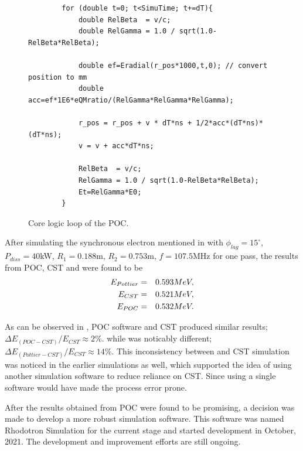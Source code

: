 \documentclass[a4paper,oneside,12pt]{report}
\numberwithin{equation}{chapter}
\begin{document}
\begin{figure}[H]
    \begin{verbatim}
        for (double t=0; t<SimuTime; t+=dT){
            double RelBeta  = v/c;
            double RelGamma = 1.0 / sqrt(1.0-RelBeta*RelBeta);
        
            double ef=Eradial(r_pos*1000,t,0); // convert position to mm
            double acc=ef*1E6*eQMratio/(RelGamma*RelGamma*RelGamma); 
        
            r_pos = r_pos + v * dT*ns + 1/2*acc*(dT*ns)*(dT*ns);
            v = v + acc*dT*ns;

            RelBeta  = v/c;
            RelGamma = 1.0 / sqrt(1.0-RelBeta*RelBeta);
            Et=RelGamma*E0; 
        }
    \end{verbatim}
    \vspace{20pt}
    \caption{Core logic loop of the POC.}
    \label{fig:POC_core_logic}
\end{figure}

After simulating the synchronous electron mentioned in  
with $\phi_{lag}=15^\circ$, $P_{diss}=40$kW, $R_1=0.188$m, $R_2=0.753$m, $f=107.5$MHz for one pass, 
the results from POC, CST and  were found to be
\vspace{-10pt}\begin{eqnarray}
    E_{Pottier} &=& 0.593 MeV  , \\
    E_{CST} &=& 0.521 MeV  ,  \label{eq:poc_E_results}\\
    E_{POC} &=& 0.532 MeV . 
\vspace{-20pt}\end{eqnarray}

As can be observed in , POC software and CST produced similar results; $\Delta E_{(POC-CST)}/E_{CST} \approx 2\%$.
while  was noticably different; $\Delta E_{(Pottier-CST)}/E_{CST} \approx 14\%$.
This inconsistency between  and  CST simulation was noticed in the earlier simulations as well, which supported the idea of using another simulation software to reduce reliance on CST.
Since using a single software would have made the process error prone.

After the results obtained from POC were found to be promising, a decision was made to develop a more robust simulation software. This software was named Rhodotron Simulation for the current stage and started development in October, 2021.
The development and improvement efforts are still ongoing. 
\end{document}
